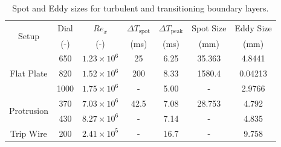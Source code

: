 \documentclass{article}
\begin{document}
\begin{table}[H]
    \centering
    \begin{tabular}{ccccccc}
        \hline
        \multirow{2}{*}{Setup} & Dial & $Re_x$ & $\Delta T_{\text{spot}}$ & $\Delta T_{\text{peak}}$ & Spot Size & Eddy Size \\
        & (-) & (-) & (ms) & (ms) & (mm) & (mm) \\
        \hline
        \hline
        \multirow{3}{*}{Flat Plate} & 650 & $1.23 \times 10^6$ & 25 & 6.25 & 35.363 & 4.8441 \\
        & 820 & $1.52 \times 10^6$ & 200 & 8.33 & 1580.4 & 0.04213\footnotemark \\
        & 1000 & $1.75 \times 10^6$ & - & 5.00 & - & 2.9766 \\
        \hline
        \hline
        \multirow{2}{*}{Protrusion} & 370 & $7.03 \times 10^6$ & 42.5 & 7.08 & 28.753 & 4.792        \\
        & 430 & $8.27 \times 10^6$ & - & 7.14 & - & 4.835 \\
        \hline
        \hline
        \multirow{1}{*}{Trip Wire} & 200 & $2.41 \times 10^5$ & - & 16.7 & - & 9.758 \\
        \hline
    \end{tabular}
    \caption{Spot and Eddy sizes for turbulent and transitioning boundary layers.}
    \label{tab:spot_sizes}
\end{table}

\end{document}
